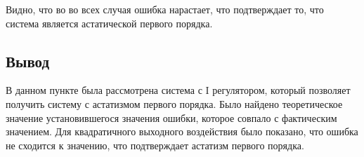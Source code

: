 



Видно, что во во всех случая ошибка нарастает, что подтверждает то, что система является астатической первого порядка. 

\FloatBarrier
\subsection{Вывод}
В данном пункте была рассмотрена система с I регулятором, который позволяет получить систему с астатизмом первого порядка.
Было найдено теоретическое значение установившегося значения ошибки, которое совпало с фактическим значением.
Для квадратичного выходного воздействия было показано, что ошибка не сходится к значению, что подтверждает астатизм первого порядка.